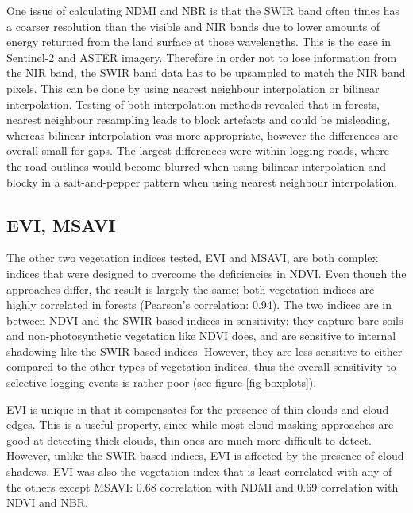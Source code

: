 \documentclass[a4paper,12pt]{scrbook}
\begin{document}
One issue of calculating \ac{NDMI} and \ac{NBR} is that the \ac{SWIR} band often times has a coarser resolution than the visible and \ac{NIR} bands due to lower amounts of energy returned from the land surface at those wavelengths. This is the case in Sentinel-2 and \ac{ASTER} imagery. Therefore in order not to lose information from the \ac{NIR} band, the \ac{SWIR} band data has to be upsampled to match the \ac{NIR} band pixels. This can be done by using nearest neighbour interpolation or bilinear interpolation. Testing of both interpolation methods revealed that in forests, nearest neighbour resampling leads to block artefacts and could be misleading, whereas bilinear interpolation was more appropriate, however the differences are overall small for gaps. The largest differences were within logging roads, where the road outlines would become blurred when using bilinear interpolation and blocky in a salt-and-pepper pattern when using nearest neighbour interpolation.

\subsection{EVI, MSAVI}

The other two vegetation indices tested, \ac{EVI} and \ac{MSAVI}, are both complex indices that were designed to overcome the deficiencies in \ac{NDVI}. Even though the approaches differ, the result is largely the same: both vegetation indices are highly correlated in forests (Pearson's correlation: 0.94). The two indices are in between \ac{NDVI} and the \ac{SWIR}-based indices in sensitivity: they capture bare soils and non-photosynthetic vegetation like \ac{NDVI} does, and are sensitive to internal shadowing like the \ac{SWIR}-based indices. However, they are less sensitive to either compared to the other types of vegetation indices, thus the overall sensitivity to selective logging events is rather poor (see figure \ref{fig-boxplots}).

\ac{EVI} is unique in that it compensates for the presence of thin clouds and cloud edges. This is a useful property, since while most cloud masking approaches are good at detecting thick clouds, thin ones are much more difficult to detect. However, unlike the \ac{SWIR}-based indices, \ac{EVI} is affected by the presence of cloud shadows. \ac{EVI} was also the vegetation index that is least correlated with any of the others except \ac{MSAVI}: 0.68 correlation with \ac{NDMI} and 0.69 correlation with \ac{NDVI} and \ac{NBR}.
\end{document}
